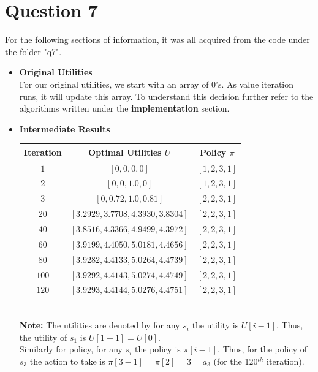 \documentclass{article}
\begin{document}
\newpage
\section*{Question 7}
For the following sections of information, it was all acquired from the code under the folder "q7".
    \begin{itemize}
        \item \textbf{Original Utilities}\\
            For our original utilities, we start with an array of 0's. As value iteration runs, 
            it will update this array. To understand this decision further refer to the algorithms
            written under the \textbf{implementation} section.
        \item \textbf{Intermediate Results}\\
            \begin{center}
            \begin{tabular}{|c|c|c|}
                \hline
                Iteration & Optimal Utilities $U$ & Policy $\pi$ \\
                \hline
                $1$ & $[0, 0, 0, 0]$ & $[1, 2, 3, 1]$\\
                $2$ & $[0, 0, 1.0, 0]$ & $ [1, 2, 3, 1]$\\
                $3$ & $[0, 0.72, 1.0, 0.81]$ & $[2, 2, 3, 1]$\\
                $20$ & $[3.2929, 3.7708, 4.3930, 3.8304]$ & $[2, 2, 3, 1]$\\
                $40$ & $[3.8516, 4.3366, 4.9499, 4.3972]$ & $[2, 2, 3, 1]$\\
                $60$ & $[3.9199, 4.4050, 5.0181, 4.4656]$ & $[2, 2, 3, 1]$\\
                $80$ & $[3.9282, 4.4133, 5.0264, 4.4739]$ & $[2, 2, 3, 1]$\\
                $100$ & $[3.9292, 4.4143, 5.0274, 4.4749]$ & $[2, 2, 3, 1]$\\
                $120$ & $[3.9293, 4.4144, 5.0276, 4.4751]$ & $[2, 2, 3, 1]$\\
                \hline
            \end{tabular}\\
            \textbf{Note:} The utilities are denoted by for any $s_i$ the utility is $U[i - 1]$. Thus,
                the utility of $s_1$ is $U[1 - 1] = U[0]$. \\Similarly for policy, for any $s_i$ the 
                policy is $\pi[i - 1]$. Thus, for the policy of $s_3$ the action to take is
                $\pi[3 - 1] = \pi[2] = 3 = a_3$ (for the 120$^{th}$ iteration).
            

\end{center}
\end{itemize}
\end{document}
